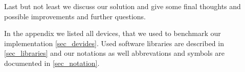 Last but not least we discuss our solution and give some final thoughts and possible improvements and further questions.

In the appendix we listed all devices, that we used to benchmark our implementation \ref{sec_devides}. Used software libraries are described in \ref{sec_libraries} and our notations as well abbrevations and symbols are documented in \ref{sec_notation}.
